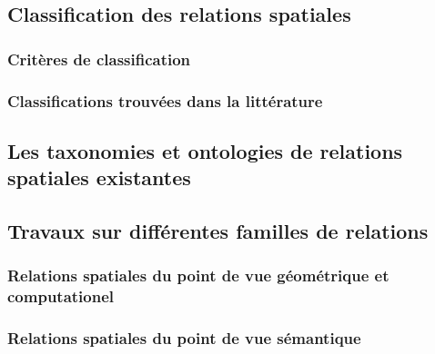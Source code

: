 \subsection{Classification des relations spatiales}

\subsubsection{Critères de classification}

\subsubsection{Classifications trouvées dans la littérature}

\subsection{Les taxonomies et ontologies de relations spatiales
  existantes}

\subsection{Travaux sur différentes familles de relations}

\subsubsection{Relations spatiales du point de vue géométrique et
  computationel}

\subsubsection{Relations spatiales du point de vue sémantique}

